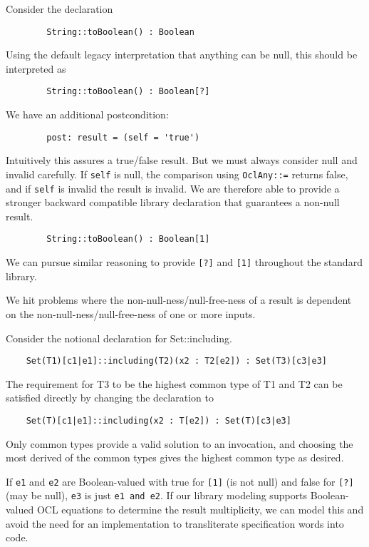 \documentclass{llncs}
\begin{document}
Consider the declaration
\begin{verbatim}
        String::toBoolean() : Boolean
\end{verbatim}
Using the default legacy interpretation that anything can be null, this should be interpreted as
\begin{verbatim}
        String::toBoolean() : Boolean[?]
\end{verbatim}
We have an additional postcondition:
\begin{verbatim}
        post: result = (self = 'true')
\end{verbatim}

Intuitively this assures a true/false result. But we must always consider null and invalid carefully. If \verb$self$ is null, the comparison using \verb$OclAny::=$ returns false, and if \verb$self$ is invalid the result is invalid. We are therefore able to provide a stronger backward compatible library declaration that guarantees a non-null result.
\begin{verbatim}
        String::toBoolean() : Boolean[1]
\end{verbatim}

We can pursue similar reasoning to provide \verb$[?]$ and \verb$[1]$ throughout the standard library.

We hit problems where the non-null-ness/null-free-ness of a result is dependent on the non-null-ness/null-free-ness of one or more inputs.

Consider the notional declaration for Set::including.
\begin{verbatim}
    Set(T1)[c1|e1]::including(T2)(x2 : T2[e2]) : Set(T3)[c3|e3]
\end{verbatim}

The requirement for T3 to be the highest common type of T1 and T2 can be satisfied directly by changing the declaration to
\begin{verbatim}
    Set(T)[c1|e1]::including(x2 : T[e2]) : Set(T)[c3|e3]
\end{verbatim}
Only common types provide a valid solution to an invocation, and choosing the most derived of the common types gives the highest common type as desired.

If \verb$e1$ and \verb$e2$ are Boolean-valued with true for \verb$[1]$ (is not null) and false for \verb$[?]$ (may be null), \verb$e3$ is just \verb$e1 and e2$. If our library modeling supports Boolean-valued OCL equations to determine the result multiplicity, we can model this and avoid the need for an implementation to transliterate specification words into code.
\end{document}
